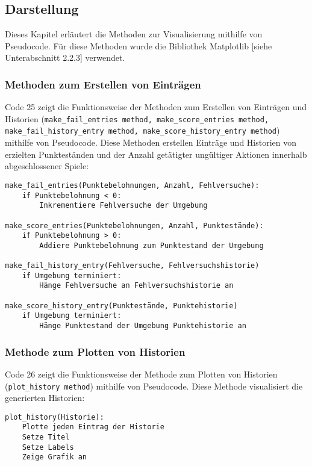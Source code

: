 \subsection{Darstellung}
Dieses Kapitel erläutert die Methoden zur Visualisierung mithilfe von Pseudocode. Für diese Methoden wurde die Bibliothek Matplotlib [siehe Unterabschnitt 2.2.3] verwendet.
\subsubsection{Methoden zum Erstellen von Einträgen}
\begin{minipage}{\linewidth}
Code 25 zeigt die Funktionsweise der Methoden zum Erstellen von Einträgen und Historien (\texttt{make\_fail\_entries method, make\_score\_entries method, make\_fail\_history\_entry method, make\_score\_history\_entry method}) mithilfe von Pseudocode. Diese Methoden erstellen Einträge und Historien von erzielten Punkteständen und der Anzahl getätigter ungültiger Aktionen innerhalb abgeschlossener Spiele:
\vspace{0.5cm}
\begin{lstlisting}[caption={Methoden zum Erstellen von Einträgen für Historien}]
make_fail_entries(Punktebelohnungen, Anzahl, Fehlversuche):
	if Punktebelohnung < 0:
		Inkrementiere Fehlversuche der Umgebung

make_score_entries(Punktebelohnungen, Anzahl, Punktestände):
	if Punktebelohnung > 0:
		Addiere Punktebelohnung zum Punktestand der Umgebung

make_fail_history_entry(Fehlversuche, Fehlversuchshistorie)
	if Umgebung terminiert:
		Hänge Fehlversuche an Fehlversuchshistorie an
		
make_score_history_entry(Punktestände, Punktehistorie)
	if Umgebung terminiert:
		Hänge Punktestand der Umgebung Punktehistorie an
\end{lstlisting}
\end{minipage}
\subsubsection{Methode zum Plotten von Historien}
\begin{minipage}{\linewidth}
Code 26 zeigt die Funktionsweise der Methode zum Plotten von Historien (\texttt{plot\_history method}) mithilfe von Pseudocode. Diese Methode visualisiert die generierten Historien:
\vspace{0.5cm}
\begin{lstlisting}[caption={Methode zum Plotten von Historien}]
plot_history(Historie):
	Plotte jeden Eintrag der Historie
	Setze Titel
	Setze Labels
	Zeige Grafik an
\end{lstlisting}
\end{minipage}
